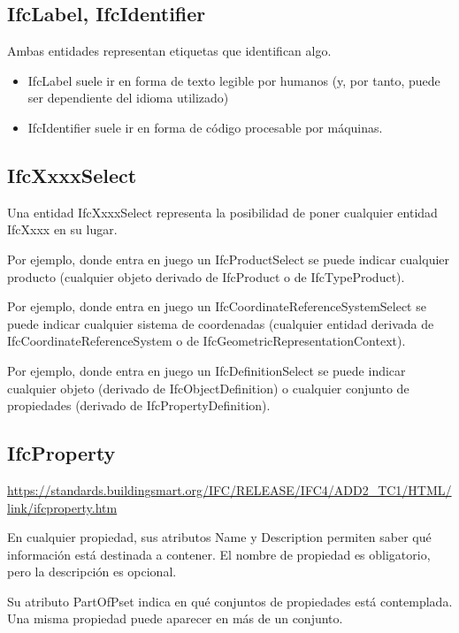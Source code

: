\documentclass[spanish,12pt,a4paper,final,oneside]{book}
\begin{document}
\subsection{IfcLabel, IfcIdentifier}
Ambas entidades representan etiquetas que identifican algo.
\begin{itemize}
\item IfcLabel suele ir en forma de texto legible por humanos (y, por tanto, puede ser dependiente del idioma utilizado)
\item IfcIdentifier suele ir en forma de código procesable por máquinas.
\end{itemize}


\subsection{IfcXxxxSelect}
Una entidad IfcXxxxSelect representa la posibilidad de poner cualquier entidad IfcXxxx en su lugar.

Por ejemplo, donde entra en juego un IfcProductSelect se puede indicar cualquier producto (cualquier objeto derivado de IfcProduct o de IfcTypeProduct).

Por ejemplo, donde entra en juego un IfcCoordinateReferenceSystemSelect se puede indicar cualquier sistema de coordenadas (cualquier entidad derivada de IfcCoordinateReferenceSystem o de IfcGeometricRepresentationContext).

Por ejemplo, donde entra en juego un IfcDefinitionSelect se puede indicar cualquier objeto (derivado de IfcObjectDefinition) o cualquier conjunto de propiedades (derivado de IfcPropertyDefinition).

\subsection{IfcProperty}
\url{https://standards.buildingsmart.org/IFC/RELEASE/IFC4/ADD2_TC1/HTML/link/ifcproperty.htm}

En cualquier propiedad, sus atributos Name y Description permiten saber qué información está destinada a contener. El nombre de propiedad es obligatorio, pero la descripción es opcional.

Su atributo PartOfPset indica en qué conjuntos de propiedades está contemplada. Una misma propiedad puede aparecer en más de un conjunto.

\vspace{0.5cm}
\end{document}
